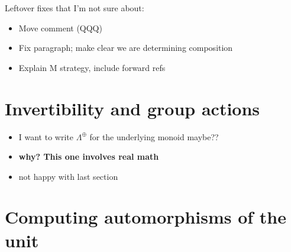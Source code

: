 \documentclass{amsart}
\begin{document}
Leftover fixes that I'm not sure about:
\begin{itemize}
\item Move comment (QQQ)
\item Fix paragraph; make clear we are determining composition
\item Explain M strategy, include forward refs
\end{itemize}



\section{ Invertibility and group actions}

\begin{itemize}
\item I want to write $\Lambda^{\oplus}$ for the underlying monoid maybe??
\item \textbf{why? This one involves real math}
\item not happy with last section
\end{itemize}



\section{ Computing automorphisms of the unit}
\end{document}
